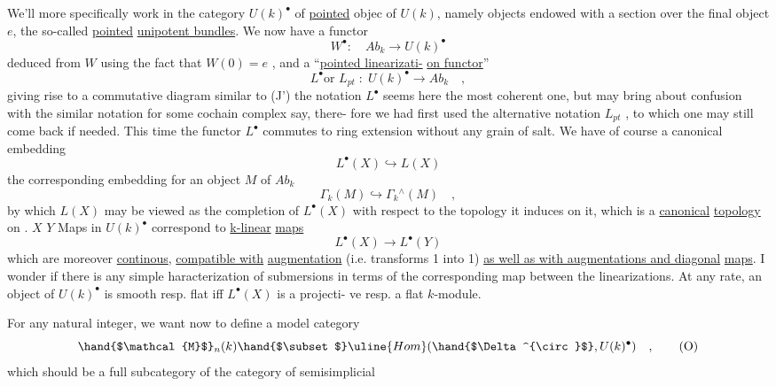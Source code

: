 
We'll more specifically work in the category $U(k)^\bullet$ of \uline{pointed} objec
of $U(k)$, namely objects endowed with a section over the final object $e$,
the so-called \uline{pointed} \uline{unipotent bundles}. We now have a functor
\[ W^\bullet : \quad Ab_k \longrightarrow U(k)^\bullet \tag{L} \]
deduced from $W$ using the fact that $W(0)=e$ , and a ``\uline{pointed linearizati-}%
\uline{on functor}''
\[ L^\bullet \text{or } L_{pt} \;:\; U(k)^\bullet \longrightarrow Ab_k \quad , \tag{M} \]
giving rise to a commutative diagram similar to (J')
the notation $L^\bullet$ seems here the most coherent one, but may bring about
confusion with the similar notation for some cochain complex say, there-%
fore we had first used the alternative notation $L_{pt}$ , to which one may
still come back if needed. This time the functor $L^\bullet$ commutes to ring
extension without any grain of salt. We have of course a canonical
embedding
\[ L^\bullet(X) \hookrightarrow L(X) \tag{N} \]
  the corresponding embedding for an object $M$ of $Ab_k$
\[ \Gamma_k(M) \hookrightarrow \Gamma_k{}^{\wedge}(M) \quad , \tag{N'} \]
by which $L(X)$ may be viewed as the completion of $L^\bullet(X)$ with respect to
the topology it induces on it, which is a \uline{canonical} \uline{topology} on .
$X$ \quad $Y$
Maps in $U(k)^\bullet$ correspond to \uline{k-linear} \uline{maps}
\[ L^\bullet(X) \longrightarrow L^\bullet(Y) \]
which are moreover \uline{continous},  \uline{compatible with} \uline{augmentation}
(i.e. transforms 1 into 1) \uline{as well as with augmentations and diagonal}
\uline{maps}. I wonder if there is any simple haracterization of submersions
 in terms of the corresponding map between the linearizations. At any
rate, an object  of $U(k)^\bullet$ is smooth resp. flat iff $L^\bullet(X)$ is a projecti-%
ve resp. a flat $k$-module.

For any natural integer, we want now to define a model category
\[ \hand{$\mathcal{M}$}_n(k) \hand{$\subset$} \uline{Hom}(\hand{$\Delta^{\circ}$}, U(k)^\bullet) \quad , \tag{O} \]
which should be a full subcategory of the category of semisimplicial

